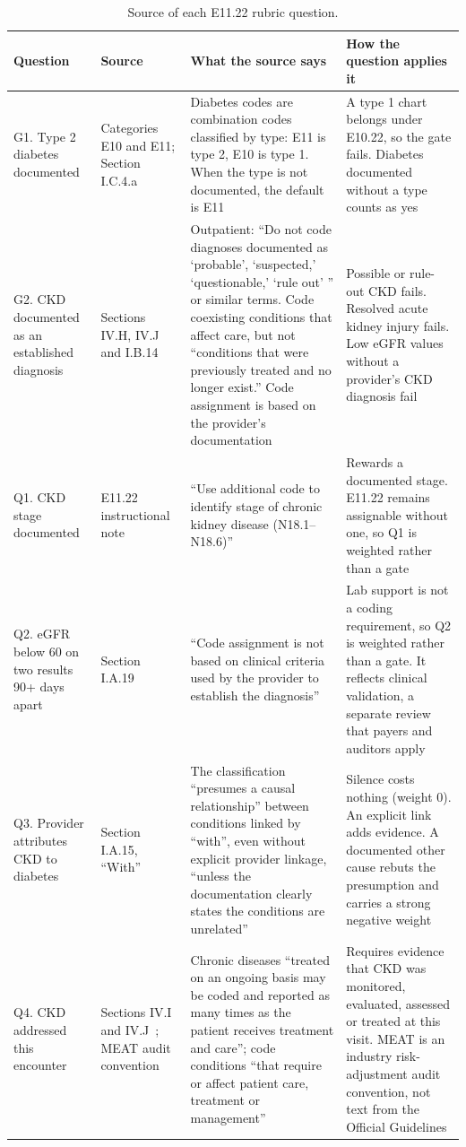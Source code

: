 \documentclass[10pt,letterpaper]{article}
\begin{document}
\begin{table}[!htbp]
\centering\small
\caption{Source of each E11.22 rubric question.}\label{tab:sources}
\begin{tabularx}{\textwidth}{@{}p{2.2cm}p{2.1cm}LL@{}}
\toprule
Question & Source & What the source says & How the question applies it \\
\midrule
G1. Type 2 diabetes documented & Categories E10 and E11; Section I.C.4.a~\cite{guidelines} & Diabetes codes are combination codes classified by type: E11 is type 2, E10 is type 1. When the type is not documented, the default is E11 & A type 1 chart belongs under E10.22, so the gate fails. Diabetes documented without a type counts as yes \\
G2. CKD documented as an established diagnosis & Sections IV.H, IV.J and I.B.14~\cite{guidelines} & Outpatient: ``Do not code diagnoses documented as `probable', `suspected,' `questionable,' `rule out' '' or similar terms. Code coexisting conditions that affect care, but not ``conditions that were previously treated and no longer exist.'' Code assignment is based on the provider's documentation & Possible or rule-out CKD fails. Resolved acute kidney injury fails. Low eGFR values without a provider's CKD diagnosis fail \\
Q1. CKD stage documented & E11.22 instructional note~\cite{tabular} & ``Use additional code to identify stage of chronic kidney disease (N18.1--N18.6)'' & Rewards a documented stage. E11.22 remains assignable without one, so Q1 is weighted rather than a gate \\
Q2. eGFR below 60 on two results 90+ days apart & Section I.A.19~\cite{guidelines} & ``Code assignment is not based on clinical criteria used by the provider to establish the diagnosis'' & Lab support is not a coding requirement, so Q2 is weighted rather than a gate. It reflects clinical validation, a separate review that payers and auditors apply \\
Q3. Provider attributes CKD to diabetes & Section I.A.15, ``With''~\cite{guidelines} & The classification ``presumes a causal relationship'' between conditions linked by ``with'', even without explicit provider linkage, ``unless the documentation clearly states the conditions are unrelated'' & Silence costs nothing (weight 0). An explicit link adds evidence. A documented other cause rebuts the presumption and carries a strong negative weight \\
Q4. CKD addressed this encounter & Sections IV.I and IV.J~\cite{guidelines}; MEAT audit convention & Chronic diseases ``treated on an ongoing basis may be coded and reported as many times as the patient receives treatment and care''; code conditions ``that require or affect patient care, treatment or management'' & Requires evidence that CKD was monitored, evaluated, assessed or treated at this visit. MEAT is an industry risk-adjustment audit convention, not text from the Official Guidelines \\
\bottomrule
\end{tabularx}
\end{table}
\end{document}
